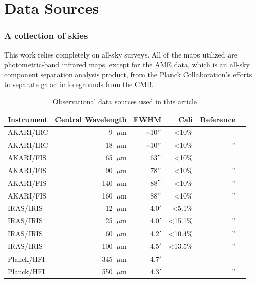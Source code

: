 \chapter{Data Sources}
  \label{ch:datasources}

  \subsection{A collection of skies}
    This work relies completely on all-sky surveys. All of the maps utilized are photometric-band infrared maps, except for the AME data, which is an all-sky component separation analysis product, from the Planck Collaboration's efforts to separate galactic foregrounds from the CMB.


    \begin{table}
      \label{tab:data}
      \caption{Observational data sources used in this article}
      \centering
        \begin{tabular}{lrrrrr}
        \hline\hline
        Instrument & Central Wavelength & FWHM & Cali & Reference \\
        \hline
        AKARI/IRC & 9~$\mu$m  &  \~{}10$"$ & \textless 10\%   & \citep{ishihara10} \\
        AKARI/IRC & 18~$\mu$m & \~{}10$"$  & \textless 10\%     & '' \\
        AKARI/FIS & 65~$\mu$m  & 63$"$ & \textless 10\% & \citep{doi15,takita16} \\
        AKARI/FIS & 90~$\mu$m  & 78$"$ & \textless 10\%   & '' \\
        AKARI/FIS & 140~$\mu$m & 88$"$ & \textless 10\%   & '' \\
        AKARI/FIS & 160~$\mu$m & 88$"$ & \textless 10\%   & '' \\
        IRAS/IRIS & 12~$\mu$m   & 4.0$'$ &   \textless 5.1\%       & \citep{iris05} \\
        IRAS/IRIS & 25~$\mu$m   & 4.0$'$ &    \textless 15.1\%      & ''\\
        IRAS/IRIS & 60~$\mu$m   & 4.2$'$ &    \textless 10.4\%      & '' \\
        IRAS/IRIS & 100~$\mu$m  & 4.5$'$ &   \textless 13.5\%       & '' \\
        Planck/HFI & 345~$\mu$m & 4.7$'$ & & \citep{hfi14viii} \\
        Planck/HFI & 550~$\mu$m & 4.3$'$& & '' \\
        \hline
      \end{tabular}
    \end{table}

